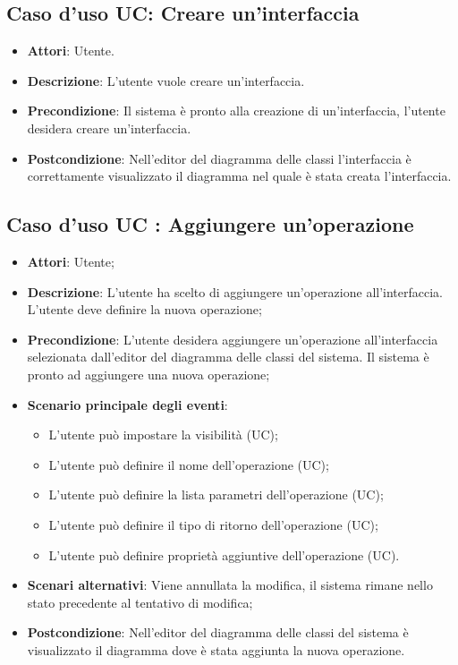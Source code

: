 \documentclass[../AnalisiDeiRequisiti.tex]{subfiles}
\begin{document}
		
		\subsection{Caso d'uso UC: Creare un'interfaccia}
		\begin{itemize}
			\item\textbf{Attori}: Utente.
			\item\textbf{Descrizione}: L'utente vuole creare un'interfaccia.
			\item\textbf{Precondizione}: Il sistema è pronto alla creazione di un'interfaccia, l'utente desidera creare un'interfaccia.
			\item\textbf{Postcondizione}: Nell'editor del diagramma delle classi l'interfaccia è correttamente visualizzato il diagramma nel quale è stata creata l'interfaccia.
		\end{itemize}
			
				
	
		\subsection{Caso d'uso UC : Aggiungere un'operazione}
			\begin{itemize}
				\item \textbf{Attori}: Utente;
				\item \textbf{Descrizione}: L'utente ha scelto di aggiungere un'operazione
				all'interfaccia. L'utente deve definire la nuova operazione;
				\item \textbf{Precondizione}: L'utente desidera aggiungere un'operazione
				all'interfaccia selezionata dall'editor del diagramma delle classi del
				sistema. Il sistema è pronto ad aggiungere una nuova operazione;
				\item \textbf{Scenario principale degli eventi}:
					\begin{itemize}
						\item L'utente può impostare la visibilità (UC);
						\item L'utente può definire il nome dell'operazione (UC);
						\item L'utente può definire la lista parametri dell'operazione (UC);
						\item L'utente può definire il tipo di ritorno dell'operazione (UC);
						\item L'utente può definire proprietà aggiuntive dell'operazione (UC).
					\end{itemize}
				\item \textbf{Scenari alternativi}: Viene annullata la modifica, il sistema
				rimane nello stato precedente al tentativo di modifica;
				\item \textbf{Postcondizione}: Nell'editor del diagramma delle classi del
				sistema è visualizzato il diagramma dove è stata aggiunta la nuova operazione.
			\end{itemize}
\end{document}
